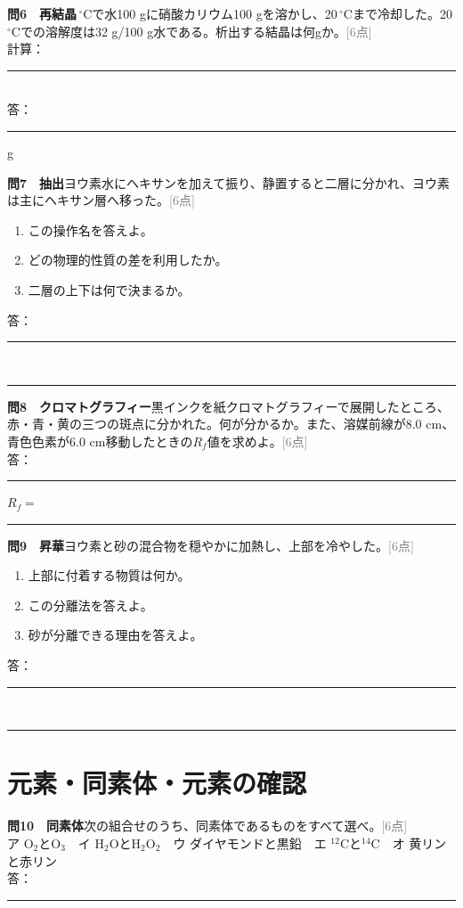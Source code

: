 \documentclass[11pt,a4paper]{ctexart}
\newcommand{\blank}[1]{\rule{#1}{0.4pt}}
\newcommand{\score}[1]{\hfill\textcolor{gray}{[#1点]}}
\newenvironment{qbox}{\begin{list}{}{\setlength{\leftmargin}{0pt}}\item\begin{minipage}{\linewidth}}{\end{minipage}\end{list}\vspace{3mm}}
\begin{document}
\begin{qbox}\textbf{問6　再結晶}\,$^\circ$Cで水100 gに硝酸カリウム100 gを溶かし、20\,$^\circ$Cまで冷却した。20\,$^\circ$Cでの溶解度は32 g/100 g水である。析出する結晶は何gか。\score{6}\\[3mm]
計算：\blank{130mm}\\[6mm]答：\blank{40mm} g\end{qbox}

\begin{qbox}\textbf{問7　抽出}\quad ヨウ素水にヘキサンを加えて振り、静置すると二層に分かれ、ヨウ素は主にヘキサン層へ移った。\score{6}
\begin{enumerate}[label=(\arabic*),leftmargin=9mm]\item この操作名を答えよ。\item どの物理的性質の差を利用したか。\item 二層の上下は何で決まるか。\end{enumerate}
答：\blank{150mm}\\[3mm]\blank{150mm}\end{qbox}

\begin{qbox}\textbf{問8　クロマトグラフィー}\quad 黒インクを紙クロマトグラフィーで展開したところ、赤・青・黄の三つの斑点に分かれた。何が分かるか。また、溶媒前線が8.0 cm、青色色素が6.0 cm移動したときの$R_f$値を求めよ。\score{6}\\[3mm]
答：\blank{120mm}\quad $R_f=$\blank{18mm}\end{qbox}

\begin{qbox}\textbf{問9　昇華}\quad ヨウ素と砂の混合物を穏やかに加熱し、上部を冷やした。\score{6}
\begin{enumerate}[label=(\arabic*),leftmargin=9mm]\item 上部に付着する物質は何か。\item この分離法を答えよ。\item 砂が分離できる理由を答えよ。\end{enumerate}
答：\blank{150mm}\\[3mm]\blank{150mm}\end{qbox}

\section{元素・同素体・元素の確認}
\begin{qbox}\textbf{問10　同素体}\quad 次の組合せのうち、同素体であるものをすべて選べ。\score{6}\\
ア O$_2$とO$_3$　イ H$_2$OとH$_2$O$_2$　ウ ダイヤモンドと黒鉛　エ ${}^{12}$Cと${}^{14}$C　オ 黄リンと赤リン\\[2mm]
答：\blank{50mm}\end{qbox}
\end{document}
